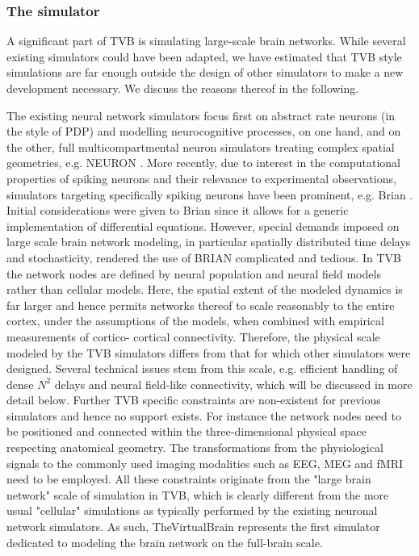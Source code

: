 \subsubsection{The simulator}



A significant part of TVB is simulating large-scale brain networks. While
several existing simulators could have been adapted, we have estimated that
TVB style simulations are far enough outside the design of other simulators to
make a new development necessary. We discuss the reasons thereof in the following. 

The existing neural network simulators focus first on abstract rate neurons (in
the style of PDP) and modelling neurocognitive processes, on one hand, and on
the other, full multicompartmental neuron simulators treating complex spatial
geometries, e.g. NEURON \cite{Hines_2001}.  More recently, due to interest in
the computational properties of spiking neurons and their relevance to
experimental observations, simulators targeting specifically spiking neurons
have been prominent, e.g. Brian \cite{Goodman_2009}. Initial considerations
were given to  Brian  since it allows for a generic
implementation of differential equations. However, special demands imposed on
large scale brain network modeling, in particular spatially distributed time
delays and stochasticity, rendered the use of BRIAN complicated and tedious.
In TVB the network nodes are defined by neural population and neural field
models \cite{Deco_2008a, Coombes_2010} rather than cellular models. Here, the
spatial extent of the modeled dynamics is far larger and hence permits networks
thereof to scale reasonably to the entire cortex, under the assumptions of the
models, when combined with empirical measurements of cortico- cortical
connectivity. Therefore, the physical scale modeled by the TVB simulators
differs from that for which other simulators were designed.  Several technical
issues stem from this scale, e.g. efficient handling of dense $N^2$ delays and
neural field-like connectivity, which will be discussed in more detail below.
Further TVB specific constraints are non-existent for previous simulators and
hence no support exists. For instance the network nodes need to be positioned
and connected within the three-dimensional physical space respecting anatomical
geometry. The transformations from the physiological signals to the commonly
used imaging modalities such as EEG, MEG and fMRI need to be employed. All
these constraints originate from the "large brain network" scale of simulation
in TVB, which is clearly different from the more usual "cellular" simulations
as typically performed by the existing neuronal network simulators. As such,
TheVirtualBrain represents the first simulator dedicated to modeling the brain
network on the full-brain scale. 


